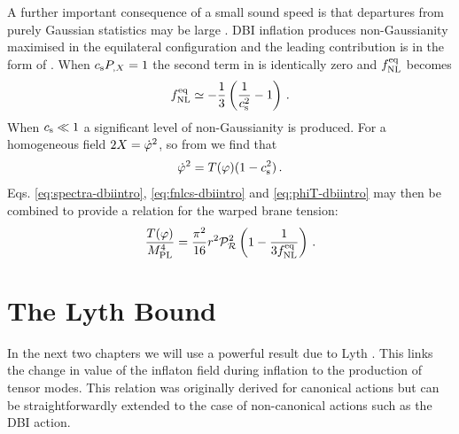 A further important consequence of a small sound speed is that departures  
from purely Gaussian statistics may be large 
\cite{brane6,brane11,lidser3,chenetal}. 
DBI inflation produces non-Gaussianity maximised in the equilateral
configuration and the leading contribution is in the form of
. 
When $c_\mathrm{s}P_{,X}=1$ the second term in 
 is identically zero and $f_{\mathrm{NL}}^{\mathrm{eq}}$ becomes
\cite{chenetal,lidser2}
% 
\begin{equation}
\label{eq:fnlcs-dbiintro}
f_{\mathrm{NL}}^{\mathrm{eq}} \simeq -\frac{1}{3} \left( \frac{1}{c_\mathrm{s}^2} -1 \right) \,.
\end{equation}
% 
When $c_\mathrm{s}\ll1$ a significant level of non-Gaussianity is produced.
% 
For a homogeneous field $2X = \dot{\varphi}^2$, so from  we
find that
\begin{equation}
\label{eq:phiT-dbiintro}
 \dot{\varphi}^2 = T(\varphi)(1-c_\mathrm{s}^2)\,.
\end{equation}
Eqs. \eqref{eq:spectra-dbiintro},
\eqref{eq:fnlcs-dbiintro} and \eqref{eq:phiT-dbiintro}
may then be combined to provide a relation for the warped brane tension: 
% 
\begin{equation}
\label{eq:obswarp-dbiintro}
\frac{T (\varphi)}{M_{\mathrm{PL}}^4}  = 
\frac{\pi^2}{16} r^2\mathcal{P}_{\mathcal{R}}^2  \left( 1-\frac{1}{3f_{\mathrm{NL}}^{\mathrm{eq}}} \right) \,.
\end{equation}
% 


\section{The Lyth Bound}
\label{sec:lyth-dbiintro}
In the next two chapters we will use a powerful result due to Lyth \cite{lyth}. This
links the change in value of the inflaton field during inflation to the production of tensor
modes. This relation was originally derived for canonical actions but can be straightforwardly
extended to the case of non-canonical actions such as the DBI action.

